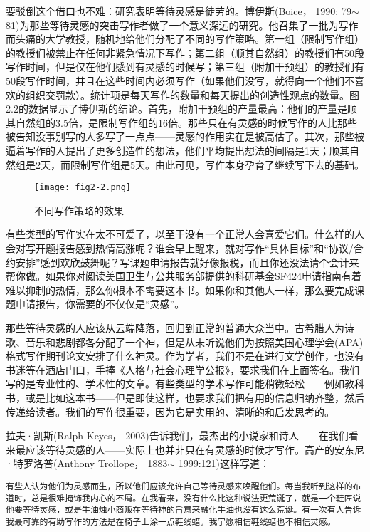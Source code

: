 要驳倒这个借口也不难：研究表明等待灵感是徒劳的。博伊斯(Boice， 1990: 79$\sim$ 81)为那些等待灵感的突击写作者做了一个意义深远的研究。他召集了一批为写作而头痛的大学教授，随机地给他们分配了不同的写作策略。第一组（限制写作组）的教授们被禁止在任何非紧急情况下写作；第二组（顺其自然组）的教授们有50段写作时间，但是仅在他们感到有灵感的时候写；第三组（附加干预组）的教授们有50段写作时间，并且在这些时间内必须写作（如果他们没写，就得向一个他们不喜欢的组织交罚款）。统计项是每天写作的数量和每天提出的创造性观点的数量。图2.2的数据显示了博伊斯的结论。首先，附加干预组的产量最高：他们的产量是顺其自然组的3.5倍，是限制写作组的16倍。那些只在有灵感的时候写作的人比那些被告知没事别写的人多写了一点点——灵感的作用实在是被高估了。其次，那些被逼着写作的人提出了更多创造性的想法，他们平均提出想法的间隔是1天；顺其自然组是2天，而限制写作组是5天。由此可见，写作本身孕育了继续写下去的基础。

\begin{figure}[!htb]
\label{fig2-2}
\centering
\texttt{[image: fig2-2.png]}
\caption{不同写作策略的效果}
\end{figure}

有些类型的写作实在太不可爱了，以至于没有一个正常人会喜爱它们。什么样的人会对写开题报告感到热情高涨呢？谁会早上醒来，就对写作“具体目标”和“协议/合约安排”感到欢欣鼓舞呢？写课题申请报告就好像报税，而且你还没法请个会计来帮你做。如果你对阅读美国卫生与公共服务部提供的科研基金SF424申请指南有着难以抑制的热情，那么你根本不需要这本书。如果你和其他人一样，那么要完成课题申请报告，你需要的不仅仅是“灵感”。

那些等待灵感的人应该从云端降落，回归到正常的普通大众当中。古希腊人为诗歌、音乐和悲剧都各分配了一个神，但是从未听说他们为按照美国心理学会(APA)格式写作期刊论文安排了什么神灵。作为学者，我们不是在进行文学创作，也没有书迷等在酒店门口，手捧《人格与社会心理学公报》，要求我们在上面签名。我们写的是专业性的、学术性的文章。有些类型的学术写作可能稍微轻松——例如教科书，或是比如这本书——但是即使这样，也要求我们把有用的信息归纳齐整，然后传递给读者。我们的写作很重要，因为它是实用的、清晰的和启发思考的。

拉夫·凯斯(Ralph Keyes， 2003)告诉我们，最杰出的小说家和诗人——在我们看来最应该等待灵感的人——实际上也并非只在有灵感的时候才写作。高产的安东尼·特罗洛普(Anthony Trollope， 1883$\sim$ 1999:121)这样写道：

\begin{lstlisting}
有些人认为他们为灵感而生，所以他们应该允许自己等待灵感来唤醒他们。每当我听到这样的布道时，总是很难掩饰我内心的不屑。在我看来，没有什么比这种说法更荒诞了，就是一个鞋匠说他要等待灵感，或是牛油烛小商贩在等待神的旨意来融化牛油也没有这么荒诞。有一次有人告诉我最可靠的有助写作的方法是在椅子上涂一点鞋线蜡。我宁愿相信鞋线蜡也不相信灵感。
\end{lstlisting}

